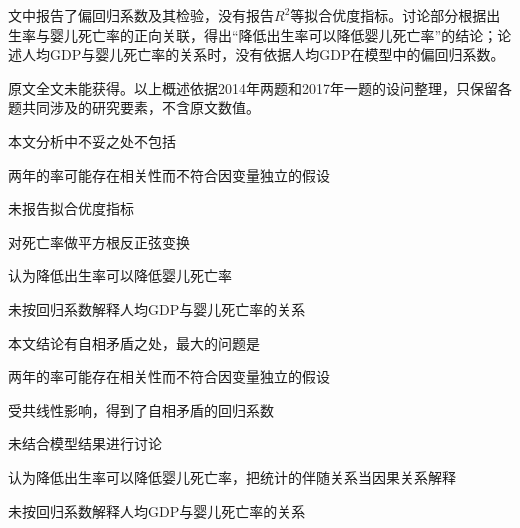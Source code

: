 文中报告了偏回归系数及其检验，没有报告\(R^2\)等拟合优度指标。讨论部分根据出生率与婴儿死亡率的正向关联，得出``降低出生率可以降低婴儿死亡率''的结论；论述人均GDP与婴儿死亡率的关系时，没有依据人均GDP在模型中的偏回归系数。

原文全文未能获得。以上概述依据2014年两题和2017年一题的设问整理，只保留各题共同涉及的研究要素，不含原文数值。


\par\addvspace{6pt}\noindent\begin{minipage}{\linewidth}


本文分析中不妥之处不包括


\begin{choices}

\item 两年的率可能存在相关性而不符合因变量独立的假设

\item 未报告拟合优度指标

\item 对死亡率做平方根反正弦变换

\item 认为降低出生率可以降低婴儿死亡率

\item 未按回归系数解释人均GDP与婴儿死亡率的关系

\end{choices}

\end{minipage}\par\vspace{4pt}

\par\addvspace{6pt}\noindent\begin{minipage}{\linewidth}


本文结论有自相矛盾之处，最大的问题是


\begin{choices}

\item 两年的率可能存在相关性而不符合因变量独立的假设

\item 受共线性影响，得到了自相矛盾的回归系数

\item 未结合模型结果进行讨论

\item 认为降低出生率可以降低婴儿死亡率，把统计的伴随关系当因果关系解释

\item 未按回归系数解释人均GDP与婴儿死亡率的关系

\end{choices}

\end{minipage}\par\vspace{4pt}

